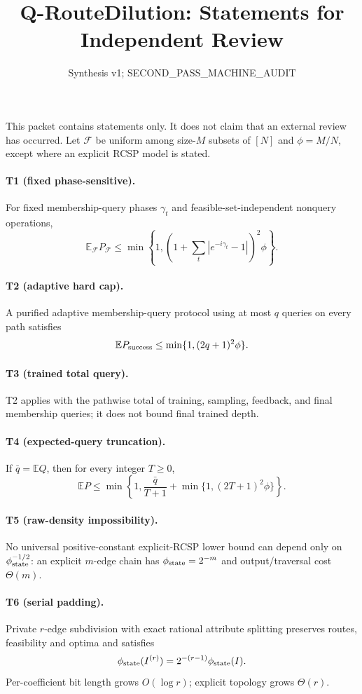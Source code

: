 \documentclass[11pt]{article}
\title{Q-RouteDilution: Statements for Independent Review}
\date{Synthesis v1; SECOND\_PASS\_MACHINE\_AUDIT}
\begin{document}
\maketitle
\noindent This packet contains statements only. It does not claim that an
external review has occurred. Let $\mathcal F$ be uniform among size-$M$
subsets of $[N]$ and $\phi=M/N$, except where an explicit RCSP model is stated.

\paragraph{T1 (fixed phase-sensitive).}
For fixed membership-query phases $\gamma_t$ and feasible-set-independent
nonquery operations,
\[
\mathbb E_{\mathcal F}P_{\mathcal F}\le
\min\left\{1,\left(1+\sum_t|e^{-i\gamma_t}-1|\right)^2\phi\right\}.
\]

\paragraph{T2 (adaptive hard cap).}
A purified adaptive membership-query protocol using at most $q$ queries on
every path satisfies
\[\mathbb E P_{\rm success}\le\min\{1,(2q+1)^2\phi\}.\]

\paragraph{T3 (trained total query).}
T2 applies with the pathwise total of training, sampling, feedback, and final
membership queries; it does not bound final trained depth.

\paragraph{T4 (expected-query truncation).}
If $\bar q=\mathbb E Q$, then for every integer $T\ge0$,
\[
\mathbb E P\le\min\left\{1,\frac{\bar q}{T+1}+
\min\{1,(2T+1)^2\phi\}\right\}.
\]

\paragraph{T5 (raw-density impossibility).}
No universal positive-constant explicit-RCSP lower bound can depend only on
$\phi_{\rm state}^{-1/2}$: an explicit $m$-edge chain has
$\phi_{\rm state}=2^{-m}$ and output/traversal cost $\Theta(m)$.

\paragraph{T6 (serial padding).}
Private $r$-edge subdivision with exact rational attribute splitting preserves
routes, feasibility and optima and satisfies
\[\phi_{\rm state}(I^{(r)})=2^{-(r-1)}\phi_{\rm state}(I).\]
Per-coefficient bit length grows $O(\log r)$; explicit topology grows
$\Theta(r)$.
\end{document}
